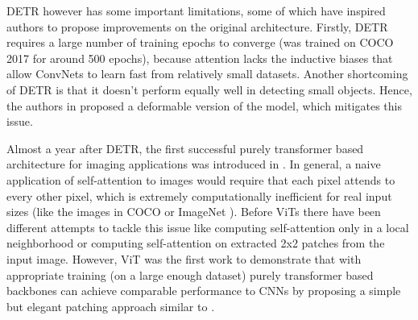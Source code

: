 DETR however has some important limitations, some of which have inspired authors to propose improvements on the original architecture. Firstly, DETR requires a large number of training epochs to converge (was trained on COCO 2017 for around 500 epochs), because attention lacks the inductive biases that allow ConvNets to learn fast from relatively small datasets. Another shortcoming of DETR is that it doesn't perform equally well in detecting small objects. Hence, the authors in \cite{zhu2020deformable} proposed a deformable version of the model, which mitigates this issue. \par
Almost a year after DETR, the first successful purely transformer based architecture for imaging applications was introduced in  \cite{dosovitskiy2020vit}. In general, a naive application of self-attention to images would require that each pixel attends to every other
pixel, which is extremely computationally inefficient for real input sizes (like the images in COCO or ImageNet \cite{imagenet}). Before ViTs there have been different attempts to tackle this issue like computing self-attention only in a local neighborhood \cite{imageTrans2018} or \cite{cordonnier} computing self-attention on extracted 2x2 patches from the input image. However, ViT was the first work to demonstrate that with appropriate training (on a large enough dataset) purely transformer based backbones can achieve comparable performance to CNNs by proposing a simple but elegant patching approach similar to \cite{cordonnier}.  

